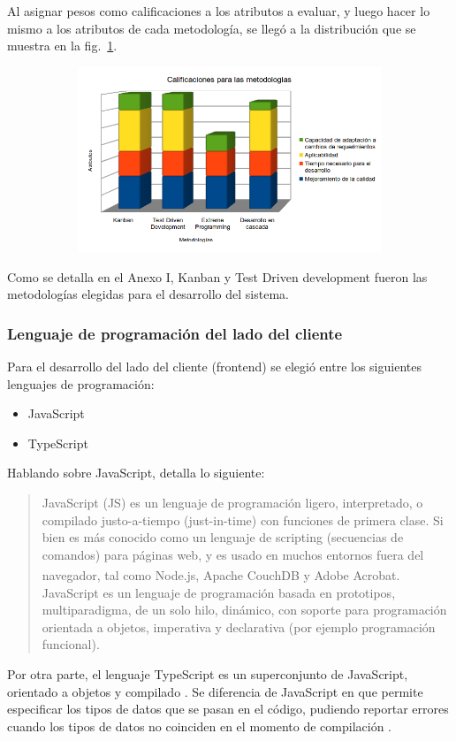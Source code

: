 \documentclass{article}
\begin{document}
Al asignar pesos como calificaciones a los atributos a evaluar, y luego hacer lo mismo a los atributos de cada metodología, se llegó a la distribución que se muestra en la fig.~\ref{fig:metodologias}.
\begin{figure}[H]
	\caption{Calificaciones para metodologías}
    \begin{subfigure}{1\textwidth}
	\includegraphics[width=1\textwidth]{calificaciones para metodologias.png}
    \end{subfigure}
	\label{fig:metodologias}
\end{figure}
\vspace{-1.0\baselineskip}
Como se detalla en el Anexo I, Kanban y Test Driven development fueron las metodologías elegidas para el desarrollo del sistema.
\subsubsection{Lenguaje de programación del lado del cliente}
Para el desarrollo del lado del cliente (frontend) se elegió entre los siguientes lenguajes de programación:
\begin{itemize}
    \item JavaScript
    \item TypeScript
\end{itemize}
Hablando sobre JavaScript, \textcite{mdnJs} detalla lo siguiente:
\blockquote{JavaScript (JS) es un lenguaje de programación ligero, interpretado, o compilado justo-a-tiempo (just-in-time) con funciones de primera clase. Si bien es más conocido como un lenguaje de scripting (secuencias de comandos) para páginas web, y es usado en muchos entornos fuera del navegador, tal como Node.js\textsuperscript{\textregistered}, Apache CouchDB y Adobe Acrobat. JavaScript es un lenguaje de programación basada en prototipos, multiparadigma, de un solo hilo, dinámico, con soporte para programación orientada a objetos, imperativa y declarativa (por ejemplo programación funcional).}
Por otra parte, el lenguaje TypeScript es un superconjunto de JavaScript, orientado a objetos y compilado \parencite{msTs}. Se diferencia de JavaScript en que permite especificar los tipos de datos que se pasan en el código, pudiendo reportar errores cuando los tipos de datos no coinciden en el momento de compilación \parencite{w3schoolsTs}. 
\end{document}
